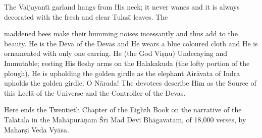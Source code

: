 The Vaijayant\={\i} garland hangs from His neck; it never wanes and it is always decorated with the fresh and clear Tulas\={\i} leaves. The

maddened bees make their humming noises incessantly and thus add to the beauty. He is the Deva of the Devas and He wears a blue coloured cloth and He is ornamented with only one earring. He (the God Vi\d{s}\d{n}u) Undecaying and Immutable; resting His fleshy arms on the Halakakuda (the lofty portion of the plough), He is upholding the golden girdle as the elephant Air\=avata of Indra upholds the golden girdle. O N\=arada! The devotees describe Him as the Source of this Leel\=a of the Universe and the Controller of the Devas.

Here ends the Twentieth Chapter of the Eighth Book on the narrative of the Tal\=atala in the Mah\=apur\=a\d{n}am \'Sr\={\i} Mad Dev\={\i} Bh\=agavatam, of 18,000 verses, by Mahar\d{s}i Veda Vy\=asa.



